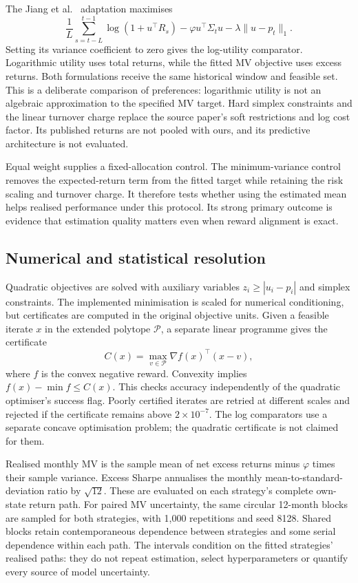\documentclass[sigconf,anonymous,review]{acmart}
\begin{document}
The Jiang et al.\ \cite{jiang2025} adaptation maximises
\begin{equation}
 \frac1L\sum_{s=t-L}^{t-1}\log(1+u^\top R_s)
 -\varphi u^\top\Sigma_tu-\lambda\|u-p_t\|_1.
\end{equation}
Setting its variance coefficient to zero gives the log-utility comparator. Logarithmic utility uses total returns, while the fitted MV objective uses excess returns. Both formulations receive the same historical window and feasible set. This is a deliberate comparison of preferences: logarithmic utility is not an algebraic approximation to the specified MV target. Hard simplex constraints and the linear turnover charge replace the source paper's soft restrictions and log cost factor. Its published returns are not pooled with ours, and its predictive architecture is not evaluated.

Equal weight supplies a fixed-allocation control. The minimum-variance control removes the expected-return term from the fitted target while retaining the risk scaling and turnover charge. It therefore tests whether using the estimated mean helps realised performance under this protocol. Its strong primary outcome is evidence that estimation quality matters even when reward alignment is exact.

\subsection{Numerical and statistical resolution}
Quadratic objectives are solved with auxiliary variables $z_i\ge |u_i-p_i|$ and simplex constraints. The implemented minimisation is scaled for numerical conditioning, but certificates are computed in the original objective units. Given a feasible iterate $x$ in the extended polytope $\mathcal P$, a separate linear programme gives the certificate
\begin{equation}
 C(x)=\max_{v\in\mathcal P}\nabla f(x)^\top(x-v),
\end{equation}
where $f$ is the convex negative reward. Convexity implies $f(x)-\min f\le C(x)$. This checks accuracy independently of the quadratic optimiser's success flag. Poorly certified iterates are retried at different scales and rejected if the certificate remains above $2\times10^{-7}$. The log comparators use a separate concave optimisation problem; the quadratic certificate is not claimed for them.

Realised monthly MV is the sample mean of net excess returns minus $\varphi$ times their sample variance. Excess Sharpe annualises the monthly mean-to-standard-deviation ratio by $\sqrt{12}$. These are evaluated on each strategy's complete own-state return path. For paired MV uncertainty, the same circular 12-month blocks are sampled for both strategies, with 1,000 repetitions and seed 8128. Shared blocks retain contemporaneous dependence between strategies and some serial dependence within each path. The intervals condition on the fitted strategies' realised paths: they do not repeat estimation, select hyperparameters or quantify every source of model uncertainty.
\end{document}
